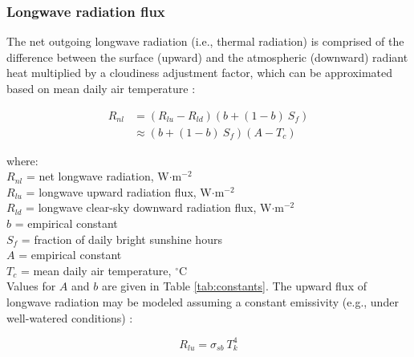 \subsubsection{Longwave radiation flux}
\label{sec:rl}
The net outgoing longwave radiation (i.e., thermal radiation) is comprised of the difference between the surface (upward) and the atmospheric (downward) radiant heat multiplied by a cloudiness adjustment factor, which can be approximated based on mean daily air temperature \parencite{linacre68}:

\begin{equation}
\label{eq:rnl}
	\begin{split}
		R_{nl} & = \left(R_{lu} - R_{ld} \right) 
		         \left(b + (1-b)\: S_f \right) \\
		       & \approx \left(b + (1-b)\: S_f \right) 
		         \left(A - T_c \right)
	\end{split}
\end{equation}

\noindent where: \\
\indent $R_{nl}$ = net longwave radiation, W$\cdot$m$^{-2}$ \\
\indent $R_{lu}$ = longwave upward radiation flux, W$\cdot$m$^{-2}$\\
\indent $R_{ld}$ = longwave clear-sky downward radiation flux, W$\cdot$m$^{-2}$\\
\indent $b$ = empirical constant\\
\indent $S_f$ = fraction of daily bright sunshine hours \\
\indent $A$ = empirical constant \\
\indent $T_c$ = mean daily air temperature, $^{\circ}$C \\

\noindent Values for $A$ and $b$ are given in Table \ref{tab:constants}. 
The upward flux of longwave radiation may be modeled assuming a constant emissivity (e.g., under well-watered conditions) \parencite[Eq. 21]{linacre68}:

\begin{equation}
\label{eq:rlu}
	R_{lu} = \sigma_{sb}\: T_k^4
\end{equation}

